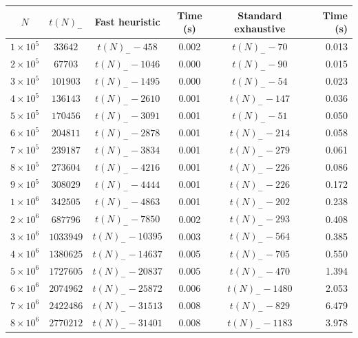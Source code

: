 \documentclass[10pt,a4paper,reqno]{amsart}
\numberwithin{equation}{section}
\theoremstyle{plain}
\theoremstyle{definition}
\begin{document}
      
\begin{table}[htp!]
  \centering
  \begin{tabular}{|c|c|c|c|c|r|}
  \hline
\rule{0pt}{11pt}  $N$ & $t(N)_-$ & Fast heuristic & Time (s) & Standard exhaustive & Time (s) \\
  \hline
\rule{0pt}{12pt}$1 \times 10^5$ & $\num{33642}$ & $t(N)_- - \num{458}$ & 0.002 & $t(N)_- - \num{70}$ & 0.013 \\
$2 \times 10^5$ & $\num{67703}$ & $t(N)_- - \num{1046}$ & 0.000 & $t(N)_- - \num{90}$ & 0.015 \\
$3 \times 10^5$ & $\num{101903}$ & $t(N)_- - \num{1495}$ & 0.000 & $t(N)_- - \num{54}$ & 0.023 \\
$4 \times 10^5$ & $\num{136143}$ & $t(N)_- - \num{2610}$ & 0.001 & $t(N)_- - \num{147}$ & 0.036 \\
$5 \times 10^5$ & $\num{170456}$ & $t(N)_- - \num{3091}$ & 0.001 & $t(N)_- - \num{51}$ & 0.050 \\
$6 \times 10^5$ & $\num{204811}$ & $t(N)_- - \num{2878}$ & 0.001 & $t(N)_- - \num{214}$ & 0.058 \\
$7 \times 10^5$ & $\num{239187}$ & $t(N)_- - \num{3834}$ & 0.001 & $t(N)_- - \num{279}$ & 0.061 \\
$8 \times 10^5$ & $\num{273604}$ & $t(N)_- - \num{4216}$ & 0.001 & $t(N)_- - \num{226}$ & 0.086 \\
$9 \times 10^5$ & $\num{308029}$ & $t(N)_- - \num{4444}$ & 0.001 & $t(N)_- - \num{226}$ & 0.172 \\\hline
\rule{0pt}{12pt}$1 \times 10^6$ & $\num{342505}$ & $t(N)_- - \num{4863}$ & 0.001 & $t(N)_- - \num{202}$ & 0.238 \\
$2 \times 10^6$ & $\num{687796}$ & $t(N)_- - \num{7850}$ & 0.002 & $t(N)_- - \num{293}$ & 0.408 \\
$3 \times 10^6$ & $\num{1033949}$ & $t(N)_- - \num{10395}$ & 0.003 & $t(N)_- - \num{564}$ & 0.385 \\
$4 \times 10^6$ & $\num{1380625}$ & $t(N)_- - \num{14637}$ & 0.005 & $t(N)_- - \num{705}$ & 0.550 \\
$5 \times 10^6$ & $\num{1727605}$ & $t(N)_- - \num{20837}$ & 0.005 & $t(N)_- - \num{470}$ & 1.394 \\
$6 \times 10^6$ & $\num{2074962}$ & $t(N)_- - \num{25872}$ & 0.006 & $t(N)_- - \num{1480}$ & 2.053 \\
$7 \times 10^6$ & $\num{2422486}$ & $t(N)_- - \num{31513}$ & 0.008 & $t(N)_- - \num{829}$ & 6.479 \\
$8 \times 10^6$ & $\num{2770212}$ & $t(N)_- - \num{31401}$ & 0.008 & $t(N)_- - \num{1183}$ & 3.978 \\

\end{tabular}
\end{table}
\end{document}
